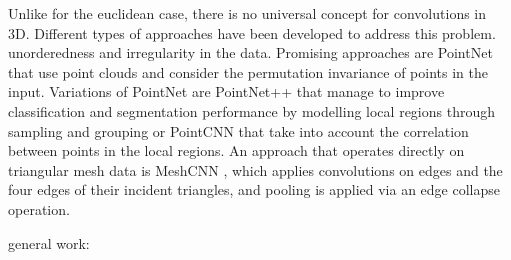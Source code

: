 \documentclass[class=article, crop=false]{standalone}
\begin{document}
Unlike for the euclidean case, there is no universal concept for convolutions in 3D. Different types of approaches have been developed to address this problem. 
unorderedness and irregularity in the data. Promising approaches are PointNet \cite{Qi2017} that use point clouds and consider the permutation invariance of points in the input. Variations of PointNet are PointNet++ \cite{Qi2017b} that manage to improve classification and segmentation performance by modelling local regions through sampling and grouping or PointCNN \cite{Li2018} that take into account the correlation between points in the local regions.
An approach that operates directly on triangular mesh data is MeshCNN \cite{Hanocka2019}, which applies convolutions on edges and the four edges of their incident triangles, and pooling is applied via an edge collapse operation.

general work: \cite{Bello2020}


\end{document}
